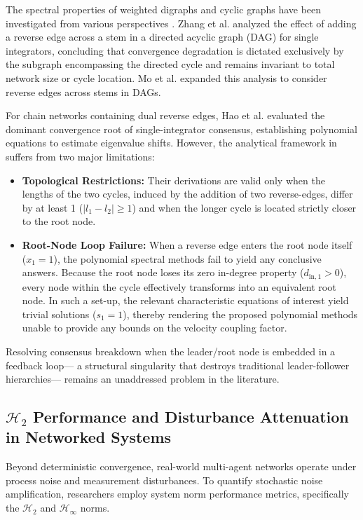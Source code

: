 The spectral properties of weighted digraphs and cyclic graphs have been investigated from various perspectives \cite{mukherjee2016consensus, mukherjee2013reachability, mukherjee2021finite}. Zhang et al. \cite{zhang2017effect} analyzed the effect of adding a reverse edge across a stem in a directed acyclic graph (DAG) for single integrators, concluding that convergence degradation is dictated exclusively by the subgraph encompassing the directed cycle and remains invariant to total network size or cycle location. Mo et al. \cite{mo2019effects} expanded this analysis to consider reverse edges across stems in DAGs.

For chain networks containing dual reverse edges, Hao et al. \cite{hao2019role} evaluated the dominant convergence root of single-integrator consensus, establishing polynomial equations to estimate eigenvalue shifts. However, the analytical framework in \cite{hao2019role} suffers from two major limitations:
\begin{itemize}
    \item \textbf{Topological Restrictions:} Their derivations are valid only when the lengths of the two cycles, induced by the addition of two reverse-edges, differ by at least 1 ($|l_1 - l_2| \ge 1$) and when the longer cycle is located strictly closer to the root node.
    \item \textbf{Root-Node Loop Failure:} When a reverse edge enters the root node itself ($x_1 = 1$), the polynomial spectral methods fail to yield any conclusive answers. Because the root node loses its zero in-degree property ($d_{\text{in},1} > 0$), every node within the cycle effectively transforms into an equivalent root node. In such a set-up, the relevant characteristic equations of interest yield trivial solutions ($s_1 = 1$), thereby rendering the proposed polynomial methods unable to provide any bounds on the velocity coupling factor.
\end{itemize}

Resolving consensus breakdown when the leader/root node is embedded in a feedback loop— a structural singularity that destroys traditional leader-follower hierarchies— remains an unaddressed problem in the literature.

\subsection{$\mathcal{H}_2$ Performance and Disturbance Attenuation in Networked Systems}
Beyond deterministic convergence, real-world multi-agent networks operate under process noise and measurement disturbances. To quantify stochastic noise amplification, researchers employ system norm performance metrics, specifically the $\mathcal{H}_2$ and $\mathcal{H}_\infty$ norms.

